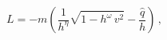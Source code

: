 \begin{equation} \label{ParticleL}
L = -  m \left( \frac{1}{h^{\eta}} \sqrt{1 - h^\omega \, v^2} -
\frac{\hat{q}}{h}\right) \, ,
\end{equation}

